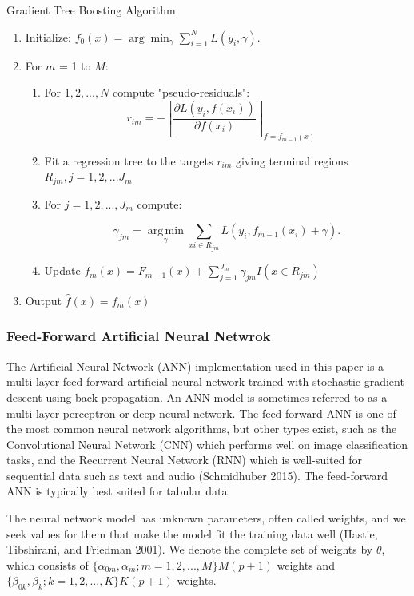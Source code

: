 \documentclass[12pt,]{article}
\begin{document}
\begin{algorithm}
  \caption{Gradient Tree Boosting Algorithm}\label{alg:GBMAlo}
\begin{enumerate}
\item Initialize: $f_0(x) = \arg\min_\gamma \sum_{i=1}^N L(y_i, \gamma).$
\item For $m$ = 1 to $M$:
  \begin{enumerate}
  \item For $1,2,...,N$ compute "pseudo-residuals":
  $$
   r_{im} = -\left[\frac{\partial L(y_i, f(x_i))}{\partial f(x_i)}\right]_{f=f_{m-1}(x)} \quad
  $$
  \item Fit a regression tree to the targets $r_{im}$ giving terminal regions $R_{jm}, j = 1,2,...J_m$
  \item For $j = 1,2,...,J_m$ compute:
  
  $$
  \gamma_{jm} = \underset{\gamma}{\operatorname{arg\,min}} \sum_{xi \in R_{jm}} L\left(y_i, f_{m-1}(x_i) + \gamma \right).
  $$
  \item Update $f_m(x) = F_{m-1}(x) + \sum_{j=1}^{J_m}\gamma_{jm}I(x \in R_{jm})$
  \end{enumerate}
\item Output $\hat{f}(x) = f_m(x)$
\end{enumerate}
\end{algorithm}

\hypertarget{feed-forward-artificial-neural-netwrok}{%
\subsubsection{Feed-Forward Artificial Neural
Netwrok}\label{feed-forward-artificial-neural-netwrok}}

The Artificial Neural Network (ANN) implementation used in this paper is
a multi-layer feed-forward artificial neural network trained with
stochastic gradient descent using back-propagation. An ANN model is
sometimes referred to as a multi-layer perceptron or deep neural
network. The feed-forward ANN is one of the most common neural network
algorithms, but other types exist, such as the Convolutional Neural
Network (CNN) which performs well on image classification tasks, and the
Recurrent Neural Network (RNN) which is well-suited for sequential data
such as text and audio (Schmidhuber 2015). The feed-forward ANN is
typically best suited for tabular data.

The neural network model has unknown parameters, often called weights,
and we seek values for them that make the model fit the training data
well (Hastie, Tibshirani, and Friedman 2001). We denote the complete set
of weights by \(\theta\), which consists of
\(\{\alpha_{0m},\alpha_m;m=1,2,...,M\} M(p+1)\) weights and
\(\{\beta_{0k},\beta_k;k=1,2,...,K\} K(p+1)\) weights.
\end{document}
